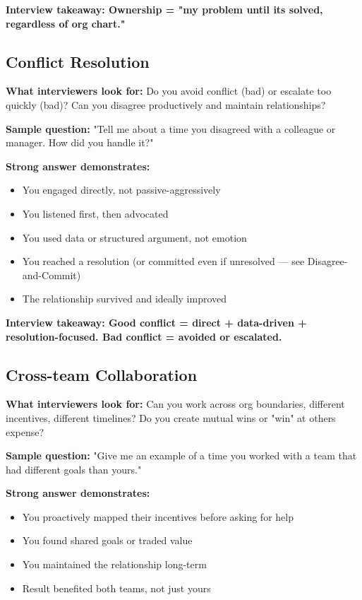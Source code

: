 \documentclass[11pt]{article}
\providecommand{\tightlist}{\setlength{\itemsep}{1pt}\setlength{\parskip}{0pt}}
\begin{document}
\textbf{Interview takeaway: Ownership = "my problem until it\textquotesingle s solved, regardless of org chart."}

\subsection{Conflict Resolution}\label{conflict-resolution}

\textbf{What interviewers look for:} Do you avoid conflict (bad) or escalate too quickly (bad)? Can you disagree productively and maintain relationships?

\textbf{Sample question:} "Tell me about a time you disagreed with a colleague or manager. How did you handle it?"

\textbf{Strong answer demonstrates:}

\begin{itemize}
\tightlist
\item
  You engaged directly, not passive-aggressively
\item
  You listened first, then advocated
\item
  You used data or structured argument, not emotion
\item
  You reached a resolution (or committed even if unresolved --- see Disagree-and-Commit)
\item
  The relationship survived and ideally improved
\end{itemize}

\textbf{Interview takeaway: Good conflict = direct + data-driven + resolution-focused. Bad conflict = avoided or escalated.}

\subsection{Cross-team Collaboration}\label{cross-team-collaboration}

\textbf{What interviewers look for:} Can you work across org boundaries, different incentives, different timelines? Do you create mutual wins or "win" at others\textquotesingle{} expense?

\textbf{Sample question:} "Give me an example of a time you worked with a team that had different goals than yours."

\textbf{Strong answer demonstrates:}

\begin{itemize}
\tightlist
\item
  You proactively mapped their incentives before asking for help
\item
  You found shared goals or traded value
\item
  You maintained the relationship long-term
\item
  Result benefited both teams, not just yours
\end{itemize}
\end{document}
